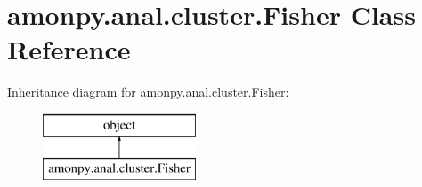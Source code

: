 \hypertarget{classamonpy_1_1anal_1_1cluster_1_1_fisher}{\section{amonpy.\-anal.\-cluster.\-Fisher Class Reference}
\label{classamonpy_1_1anal_1_1cluster_1_1_fisher}
}
Inheritance diagram for amonpy.\-anal.\-cluster.\-Fisher\-:\begin{figure}[H]
\begin{center}
\leavevmode
\includegraphics[height=2.000000cm]{classamonpy_1_1anal_1_1cluster_1_1_fisher}
\end{center}
\end{figure}
